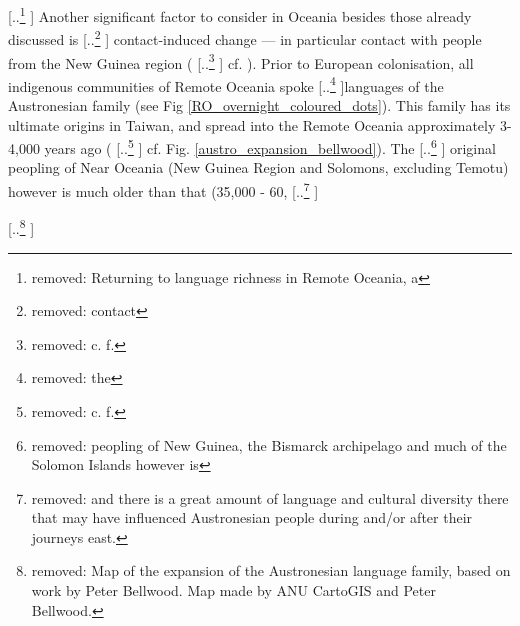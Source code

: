 \documentclass[unnumsec,webpdf,modern,medium]{oup-authoring-template}
\providecommand{\DIFaddtex}[1]{{\protect\color{blue} \sf #1}} %
\providecommand{\DIFdeltex}[1]{{\protect\color{red} [..\footnote{removed: #1} ]}} %
\providecommand{\DIFaddbegin}{} %
\providecommand{\DIFaddend}{} %
\providecommand{\DIFdelbegin}{} %
\providecommand{\DIFdelend}{} %
\providecommand{\DIFdelFL}[1]{\DIFdel{#1}} %
\providecommand{\DIFadd}[1]{\texorpdfstring{\DIFaddtex{#1}}{#1}} %
\providecommand{\DIFdel}[1]{\texorpdfstring{\DIFdeltex{#1}}{}} %
\newcommand{\DIFscaledelfig}{0.5}
\newlength{\DIFdelgraphicswidth} %
\newlength{\DIFdelgraphicsheight} %
\newcommand{\DIFaddincludegraphics}[2][]{{\color{blue}\fbox{\DIFOincludegraphics[#1]{#2}}}} %
\newcommand{\DIFdelincludegraphics}[2][]{%
\sbox{\DIFdelgraphicsbox}{\DIFOincludegraphics[#1]{#2}}%
\settoboxwidth{\DIFdelgraphicswidth}{\DIFdelgraphicsbox} %
\settoboxtotalheight{\DIFdelgraphicsheight}{\DIFdelgraphicsbox} %
\scalebox{\DIFscaledelfig}{%
\parbox[b]{\DIFdelgraphicswidth}{\usebox{\DIFdelgraphicsbox}\\[-\baselineskip] \rule{\DIFdelgraphicswidth}{0em}}\llap{\resizebox{\DIFdelgraphicswidth}{\DIFdelgraphicsheight}{%
\setlength{\unitlength}{\DIFdelgraphicswidth}%
\begin{picture}(1,1)%
\thicklines\linethickness{2pt} %
{\color[rgb]{1,0,0}\put(0,0){\framebox(1,1){}}}%
{\color[rgb]{1,0,0}\put(0,0){\line( 1,1){1}}}%
{\color[rgb]{1,0,0}\put(0,1){\line(1,-1){1}}}%
\end{picture}%
}\hspace*{3pt}}} %
} %
\DeclareRobustCommand{\DIFaddbegin}{\DIFOaddbegin \let\includegraphics\DIFaddincludegraphics} %
\DeclareRobustCommand{\DIFaddend}{\DIFOaddend \let\includegraphics\DIFOincludegraphics} %
\DeclareRobustCommand{\DIFdelbegin}{\DIFOdelbegin \let\includegraphics\DIFdelincludegraphics} %
\DeclareRobustCommand{\DIFdelend}{\DIFOaddend \let\includegraphics\DIFOincludegraphics} %
\begin{document}
\DIFdelbegin \DIFdel{Returning to language richness in Remote Oceania, a }\DIFdelend \DIFaddbegin \DIFadd{Another }\DIFaddend significant factor to consider \DIFaddbegin \DIFadd{in Oceania }\DIFaddend besides those already discussed is \DIFdelbegin \DIFdel{contact }\DIFdelend \DIFaddbegin \DIFadd{contact-induced change }\DIFaddend --- in particular \DIFaddbegin \DIFadd{contact }\DIFaddend with people from the New Guinea region (\DIFdelbegin \DIFdel{c. f. }\DIFdelend \DIFaddbegin \DIFadd{cf. }\DIFaddend \citet{ross2017_new_guinea_region}). Prior to European colonisation, all indigenous communities of Remote Oceania spoke \DIFdelbegin \DIFdel{the }\DIFdelend languages of the Austronesian family (see Fig \ref{RO_overnight_coloured_dots}). This family has its ultimate origins in Taiwan, and spread into the Remote Oceania approximately 3-4,000 years ago (\DIFdelbegin \DIFdel{c. f. }\DIFdelend \DIFaddbegin \DIFadd{cf. }\DIFaddend Fig. \ref{austro_expansion_bellwood}). The \DIFdelbegin \DIFdel{peopling of New Guinea, the Bismarck archipelago and much of the Solomon Islands however is }\DIFdelend \DIFaddbegin \DIFadd{original peopling of Near Oceania (New Guinea Region and Solomons, excluding Temotu) however is much }\DIFaddend older than that \DIFaddbegin \DIFadd{(35,000 - 60}\DIFaddend ,\DIFdelbegin \DIFdel{and there is a great amount of language and cultural diversity there that may have influenced Austronesian people during and/or after their journeys east. }%

{%
\DIFdelFL{Map of the expansion of the Austronesian language family, based on work by Peter Bellwood. Map made by ANU CartoGIS and Peter Bellwood.}}
\end{document}
